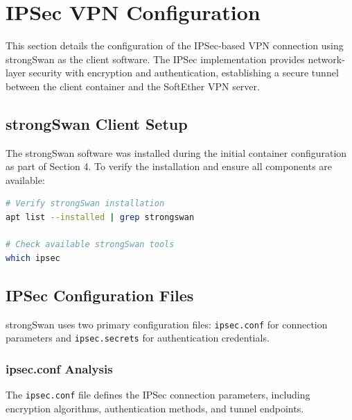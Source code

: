 \newpage

\section{IPSec VPN Configuration}

This section details the configuration of the IPSec-based VPN connection using strongSwan as the client software. The IPSec implementation provides network-layer security with encryption and authentication, establishing a secure tunnel between the client container and the SoftEther VPN server.

\subsection{strongSwan Client Setup}

The strongSwan software was installed during the initial container configuration as part of Section 4. To verify the installation and ensure all components are available:

\begin{lstlisting}[language=bash]
# Verify strongSwan installation
apt list --installed | grep strongswan

# Check available strongSwan tools
which ipsec

\end{lstlisting}

\subsection{IPSec Configuration Files}

strongSwan uses two primary configuration files: \texttt{ipsec.conf} for connection parameters and \texttt{ipsec.secrets} for authentication credentials.

\subsubsection{ipsec.conf Analysis}

The \texttt{ipsec.conf} file defines the IPSec connection parameters, including encryption algorithms, authentication methods, and tunnel endpoints.

